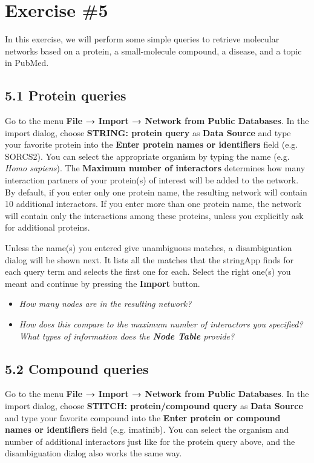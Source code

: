 \documentclass[a4paper]{article}
\begin{document}
\section*{Exercise \#5}
In this exercise, we will perform some simple queries to retrieve molecular networks based on a protein, a small-molecule compound, a disease, and a topic in PubMed.
\vspace{0,5cm}

\subsection*{5.1 Protein queries}

Go to the menu \textbf{File → Import → Network from Public Databases}. In the import dialog, choose \textbf{STRING: protein query} as \textbf{Data Source} and type your favorite protein into the \textbf{Enter protein names or identifiers} field (e.g. SORCS2). You can select the appropriate organism by typing the name (e.g. \textit{Homo sapiens}). The \textbf{Maximum number of interactors} determines how many interaction partners of your protein(s) of interest will be added to the network. By default, if you enter only one protein name, the resulting network will contain 10 additional interactors. If you enter more than one protein name, the network will contain only the interactions among these proteins, unless you explicitly ask for additional proteins.

Unless the name(s) you entered give unambiguous matches, a disambiguation dialog will be shown next. It lists all the matches that the stringApp finds for each query term and selects the first one for each. Select the right one(s) you meant and continue by pressing the \textbf{Import} button.

\begin{itemize}
  \item \textit{How many nodes are in the resulting network?}
  \item \textit{How does this compare to the maximum number of interactors you specified? What types of information does the \textbf{Node Table} provide?}
\end{itemize}

\subsection*{5.2 Compound queries}

Go to the menu \textbf{File → Import → Network from Public Databases}. In the import dialog, choose \textbf{STITCH: protein/compound query} as \textbf{Data Source} and type your favorite compound into the \textbf{Enter protein or compound names or identifiers} field (e.g. imatinib). You can select the organism and number of additional interactors just like for the protein query above, and the disambiguation dialog also works the same way.
\end{document}
